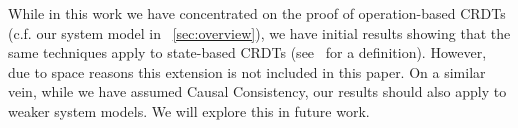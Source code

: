 While in this work we have concentrated on the proof of
operation-based CRDTs (c.f. our system model in
\sectionautorefname~\ref{sec:overview}), we have initial results
showing that the same techniques apply to state-based CRDTs
(see~\cite{ShapiroPBZ11} for a definition).
%
However, due to space reasons this extension is not included in this
paper.
%
On a similar vein, while we have assumed Causal Consistency, our
results should also apply to weaker system models.
%
We will explore this in future work.


